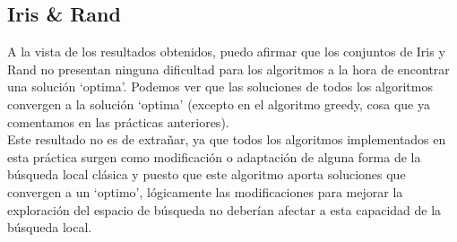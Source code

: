 \subsection{Iris \& Rand}
A la vista de los resultados obtenidos, puedo afirmar que los conjuntos de Iris y Rand no presentan ninguna dificultad para los algoritmos a la hora de encontrar una solución `optima'. Podemos ver que las soluciones de todos los algoritmos convergen a la solución `optima' (excepto en el algoritmo greedy, cosa que ya comentamos en las prácticas anteriores).\\
Este resultado no es de extrañar, ya que todos los algoritmos implementados en esta práctica surgen como modificación o adaptación de alguna forma de la búsqueda local clásica y puesto que este algoritmo aporta soluciones que convergen a un `optimo', lógicamente las modificaciones para mejorar la exploración del espacio de búsqueda no deberían afectar a esta capacidad de la búsqueda local.


